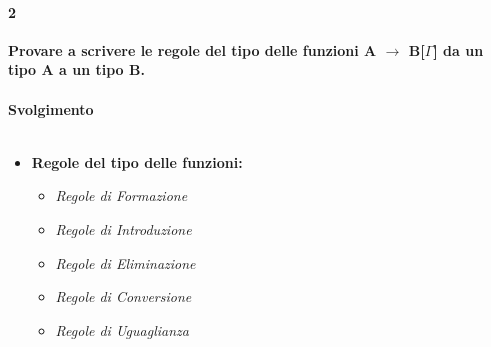 \paragraph{2}
\textbf{Provare a scrivere le regole del tipo delle funzioni A $\rightarrow$ B[$\Gamma$] da un tipo A a un tipo B.}
\\\\
\noindent
\textbf{Svolgimento}\\\\

\begin{itemize}
\item \textbf{Regole del tipo delle funzioni:}
\begin{itemize}
\item \textit{Regole di Formazione}
\begin{prooftree}
\end{prooftree}

\item \textit{Regole di Introduzione}
\begin{prooftree}
\end{prooftree}

\item \textit{Regole di Eliminazione}
\begin{prooftree}
\end{prooftree}

\item \textit{Regole di Conversione}
\begin{prooftree}
\end{prooftree}

\item \textit{Regole di Uguaglianza}
\begin{prooftree}
\end{prooftree}
\begin{prooftree}
\end{prooftree}
\end{itemize}


\end{itemize}
